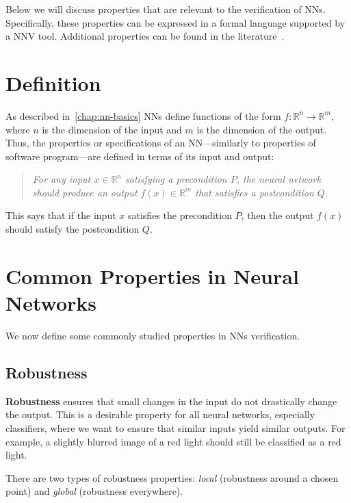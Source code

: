 \documentclass[oneside,11pt,dvipsnames]{book}
\numberwithin{equation}{section}
\theoremstyle{definition}
\theoremstyle{remark}
\begin{document}
Below we will discuss properties that are relevant to the verification of NNs. Specifically, these properties can be
expressed in a formal language supported by a NNV tool. Additional properties can be found in the literature~\cite{seshia2018formal}.

\section{Definition}\label{sec:properties-def}

As described in~\autoref{chap:nn-basics} NNs define functions of the form $f: \mathbb{R}^{n} \to \mathbb{R}^{m}$,
where $n$ is the dimension of the input and $m$ is the dimension of the output. Thus, the properties or specifications of an NN---similarly to properties of software program---are defined in terms of its input and output:

\begin{quote}
\textit{For any input $x \in \mathbb{R}^{n}$ satisfying a precondition $P$, the neural network should produce an output $f(x) \in \mathbb{R}^{m}$ that satisfies a postcondition $Q$.}
\end{quote}

This says that if the input $x$ satisfies the precondition $P$, then the output $f(x)$ should satisfy the postcondition $Q$.



\section{Common Properties in Neural Networks}

We now define some commonly studied properties in NNs verification.

\subsection{Robustness}\label{sec:properties-robustness}

\textbf{Robustness} ensures that small changes in the input do not drastically change the output. This is a desirable property for all neural networks, especially classifiers, where we want to ensure that similar inputs yield similar outputs. For example, a slightly blurred image of a red light should still be classified as a red light.

There are two types of robustness properties: \emph{local} (robustness around a chosen point) and  \emph{global} (robustness everywhere).
\end{document}
